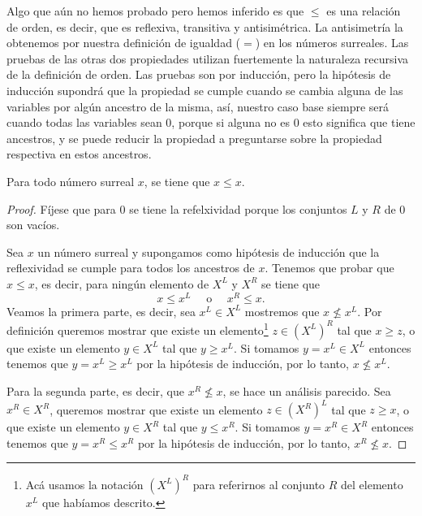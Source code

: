     Algo que a\'un no hemos probado pero hemos inferido es que $\le$ es una relaci\'on de orden, es decir, que es reflexiva, transitiva y antisim\'etrica. La antisimetr\'ia la obtenemos por nuestra definici\'on de igualdad ($=$) en los n\'umeros surreales. Las pruebas de las otras dos propiedades utilizan fuertemente la naturaleza recursiva de la definici\'on de orden. Las pruebas son por inducci\'on, pero la hip\'otesis de inducci\'on supondr\'a que la propiedad se cumple cuando se cambia alguna de las variables por alg\'un ancestro de la misma, as\'i, nuestro caso base siempre ser\'a cuando todas las variables sean $0$, porque si alguna no es $0$ esto significa que tiene ancestros, y se puede reducir la propiedad a preguntarse sobre la propiedad respectiva en estos ancestros.

    \begin{theorem}[Reflexividad]
        Para todo n\'umero surreal $x$, se tiene que $x\le x$.
    \end{theorem}

    \begin{proof}
        F\'ijese que para $0$ se tiene la refelxividad porque los conjuntos $L$ y $R$ de $0$ son vac\'ios.

        Sea $x$ un n\'umero surreal y supongamos como hip\'otesis de inducci\'on que la reflexividad se cumple para todos los ancestros de $x$. Tenemos que probar que $x\le x$, es decir, para ning\'un elemento de $X^L$ y $X^R$ se tiene que
        \[
            x \le x^L\quad\text{ o }\quad x^R \le x.
        \]
        Veamos la primera parte, es decir, sea $x^L\in X^L$ mostremos que $x \not\le x^L$. Por definici\'on queremos mostrar que existe un elemento\footnote{Ac\'a usamos la notaci\'on $(X^L)^R$ para referirnos al conjunto $R$ del elemento $x^L$ que hab\'iamos descrito.} $z\in (X^L)^R$  tal que $x \ge z$, o que existe un elemento $y \in X^L$ tal que $y \ge x^L$. Si tomamos $y = x^L \in X^L$ entonces tenemos que $y = x^L \ge x^L$ por la hip\'otesis de inducci\'on, por lo tanto, $x\not\le x^L$.

        Para la segunda parte, es decir, que $x^R \not\le x$, se hace un an\'alisis parecido. Sea $x^R\in X^R$, queremos mostrar que existe un elemento $z\in (X^R)^L$ tal que $z \ge x$, o que existe un elemento $y\in X^R$ tal que $y \le x^R$. Si tomamos $y = x^R\in X^R$ entonces tenemos que $y = x^R \le x^R$ por la hip\'otesis de inducci\'on, por lo tanto, $x^R \not\le x$.
    \end{proof}
    
